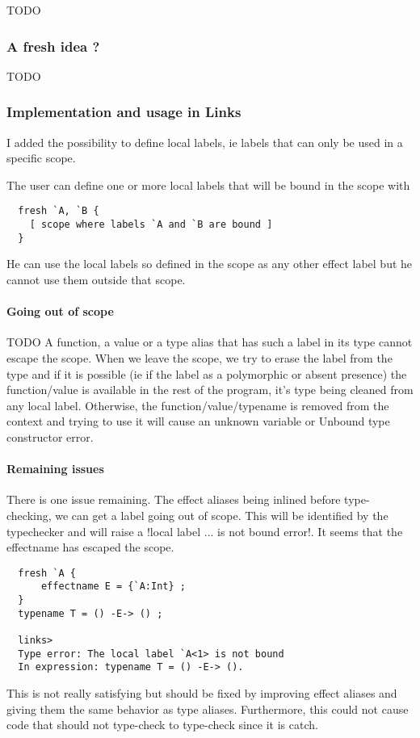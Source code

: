 \documentclass[11pt, nonacm=true, language=french, language=english]{acmart}
\begin{document}
  TODO

\subsubsection{A fresh idea ?}
\label{sec:fresh-idea}

  TODO

\subsubsection{Implementation and usage in Links}
\label{sec:impl-usage-links}

I added the possibility to define local labels, ie labels that can only be used in a specific scope.

The user can define one or more local labels that will be bound in the scope with
\begin{lstlisting}
  fresh `A, `B {
    [ scope where labels `A and `B are bound ]
  }
\end{lstlisting}

He can use the local labels so defined in the scope as any other effect label but he cannot use them outside that scope.

\paragraph{Going out of scope} TODO
A function, a value or a type alias that has such a label in its type cannot escape the scope. When we leave the scope, we try to erase the label from the type and if it is possible (ie if the label as a polymorphic or absent presence) the function/value is available in the rest of the program, it's type being cleaned from any local label. Otherwise, the function/value/typename is removed from the context and trying to use it will cause an unknown variable or Unbound type constructor error.

\paragraph{Remaining issues}
There is one issue remaining. The effect aliases being inlined before type-checking, we can get a label going out of scope. This will be identified by the typechecker and will raise a !local label ... is not bound error!. It seems that the effectname has escaped the scope.
\begin{lstlisting}
  fresh `A {
      effectname E = {`A:Int} ;
  }
  typename T = () -E-> () ;

  links>
  Type error: The local label `A<1> is not bound
  In expression: typename T = () -E-> ().
\end{lstlisting}
This is not really satisfying but should be fixed by improving effect aliases and giving them the same behavior as type aliases. Furthermore, this could not cause code that should not type-check to type-check since it is catch.
\end{document}
